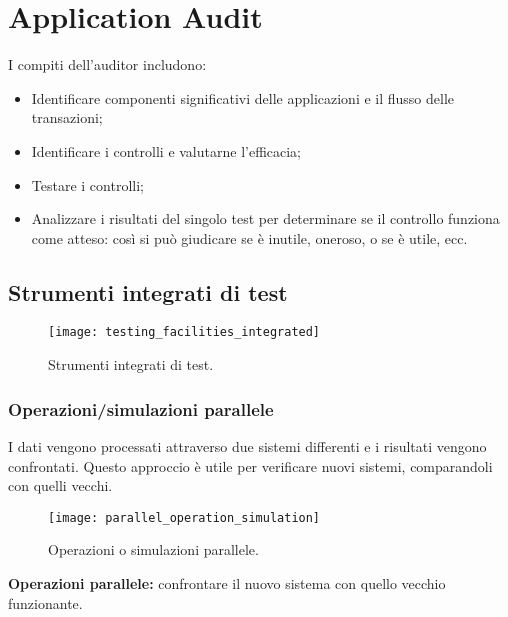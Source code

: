 \chapter{Application Audit}
\label{cs:aa}

I compiti dell'auditor includono:
\begin{itemize}
\item Identificare componenti significativi delle applicazioni e 
il flusso delle transazioni;
\item Identificare i controlli e valutarne l'efficacia;
\item Testare i controlli;
\item Analizzare i risultati del singolo test per determinare se 
il controllo funziona come atteso: così si può giudicare se è inutile,
oneroso, o se è utile, ecc.
\end{itemize}

\section{Strumenti integrati di test}

\begin{figure}[h!]
        \begin{center}
                \texttt{[image: testing\_facilities\_integrated]}
        \end{center}
        \caption{Strumenti integrati di test.}
        \label{fig:testing:facilities:integrated}
\end{figure}

\subsection{Operazioni/simulazioni parallele}

I dati vengono processati attraverso due sistemi differenti e i risultati vengono confrontati.
Questo approccio è utile per verificare nuovi sistemi, comparandoli con quelli vecchi.

\begin{figure}[h!]
        \begin{center}
                \texttt{[image: parallel\_operation\_simulation]}
        \end{center}
        \caption{Operazioni o simulazioni parallele.}
        \label{fig:testing:facilities:parallel}
\end{figure}

\textbf{Operazioni parallele:} confrontare il nuovo sistema con quello vecchio funzionante.

